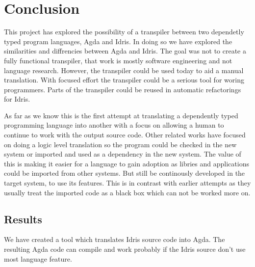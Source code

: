 \chapter{Conclusion}



This project has explored the possibility of a transpiler between two
dependetly typed program languages, Agda and Idris. In doing so we have
explored the similarities and diffrencies between Agda and Idris. The goal was
not to create a fully functional transpiler, that work is mostly software
engineering and not language research. However, the transpiler could be used
today to aid a manual translation. With focused effort the transpiler could be
a serious tool for woring programmers. Parts of the transpiler could be reused
in automatic refactorings for Idris.

As far as we know this is the first attempt at translating a dependently typed
programming language into another with a focus on allowing a human to continue
to work with the output source code.
Other related works have focused on doing a logic level translation so the
program could be checked in the new system or imported and used as
a dependency in the new system. The value of this is making it easier for
a language to gain adoption as libries and applications could be imported from
other systems. But still be continously developed in the target system, to use
its features. This is in contrast with earlier attempts as they usually treat
the imported code as a black box which can not be worked more on.


\section{Results}
We have created a tool which translates Idris source code into Agda. The
resulting Agda code can compile and work probably if the Idris source don't use
most language feature.

